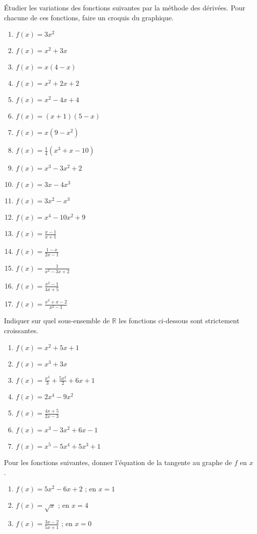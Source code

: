\begin{exercice}
\'Etudier les variations des fonctions suivantes par la méthode des dérivées. Pour chacune de ces fonctions, faire un croquis du graphique.
\begin{multicols}{2}
\begin{enumerate}
\item $f(x)=3{{x}^{2}}$
\item $f(x)={{x}^{2}}+3x$
\item $f(x)=x\left( 4-x \right)$
\item $f(x)={{x}^{2}}+2x+2$
\item $f(x)={{x}^{2}}-4x+4$
\item $f(x)=\left( x+1 \right)\left( 5-x \right)$
\item $f(x)=x\left( 9-{{x}^{2}} \right)$
\item $f(x)=\frac{1}{4}\left( {{x}^{3}}+x-10 \right)$
\item $f(x)={{x}^{3}}-3{{x}^{2}}+2$
\item $f(x)=3x-4{{x}^{3}}$
\item $f(x)=3{{x}^{2}}-{{x}^{3}}$
\item $f(x)={{x}^{4}}-10{{x}^{2}}+9$
\item $f(x)=\frac{x-1}{x+1}$
\item $f(x)=\frac{1-x}{2x-1}$
\item $f(x)=\frac{1}{{{x}^{2}}-3x+2}$
\item $f(x)=\frac{{{x}^{2}}-1}{4x+5}$
\item $f(x)=\frac{{{x}^{2}}+x-2}{{{x}^{2}}-1}$
\end{enumerate}
\end{multicols}
\end{exercice}  


\begin{exercice}
Indiquer sur quel sous-ensemble de $\mathbb{R}$ les fonctions ci-dessous sont strictement croissantes. 
\begin{multicols}{2}
\begin{enumerate}
\item $f(x)={{x}^{2}}+5x+1$
\item $f(x)={{x}^{3}}+3x$
\item $f(x)=\frac{{{x}^{3}}}{3}+\frac{5{{x}^{2}}}{2}+6x+1$
\item $f(x)=2{{x}^{4}}-9{{x}^{2}}$
\item $f(x)=\frac{4x+5}{2x-3}$
\item $f(x)={{x}^{3}}-3{{x}^{2}}+6x-1$
\item $f(x)={{x}^{5}}-5{{x}^{4}}+5{{x}^{3}}+1$ 
\end{enumerate}
\end{multicols}
\end{exercice}

\begin{exercice}
Pour les fonctions suivantes, donner l'équation de la tangente au graphe de $f$ 
en $x$. 
\begin{enumerate}
\item $f(x)=5{{x}^{2}}-6x+2\text{  ;  en }x=1$
\item $f(x)=\sqrt{x}\text{  ;  en }x=4$
\item $f(x)=\frac{3x-2}{5x+1}\text{  ;  en }x=0$
\end{enumerate}
\end{exercice}